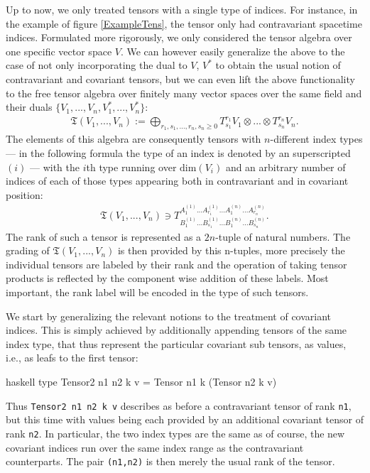 Up to now, we only treated tensors with a single type of indices. For instance, in the example of figure \ref{ExampleTens}, the tensor only had contravariant spacetime indices.
Formulated more rigorously, we only considered the tensor algebra over one specific vector space $V$.
We can however easily generalize the above to the case of not only incorporating the dual to $V$, $V^{\ast}$ to obtain the usual notion of contravariant and covariant tensors, but we can even lift the above functionality to the free tensor algebra over finitely many vector spaces over the same field and their duals $\{V_1,...,V_n,V_1^{\ast},...,V_n^{\ast}\}$:
\begin{align}
    \mathfrak{T}(V_1,...,V_n) := \bigoplus_{r_1,s_1,...,r_n,s_n \geq 0}T^{r_1}_{s_1}V_1 \otimes ... \otimes T^{r_n}_{s_n}V_n.
\end{align}
The elements of this algebra are consequently tensors with $n$-different index types --- in the following formula the type of an index is denoted by an superscripted $(i)$ --- with the $i$th type running over $\mathrm{dim}(V_i)$ and an arbitrary number of indices of each of those types appearing both in contravariant and in covariant position:
\begin{align}
    \mathfrak{T}(V_1,...,V_n) \ni T^{A^{(1)}_1 ... A^{(1)}_{r_1} ... A^{(n)}_1 ... A^{(n)}_{r_n}}
    _{B^{(1)}_1 ... B^{(1)}_{s_1} ... B^{(n)}_1 ... B^{(n)}_{s_n}}.
\end{align}
The rank of such a tensor is represented as a $2n$-tuple of natural numbers. The grading of $\mathfrak{T}(V_1,...,V_n)$ is then provided by this n-tuples, more precisely the individual tensors are labeled by their rank and the operation of taking tensor products is reflected by the component wise addition of these labels. Most important, the rank label will be encoded in the type of such tensors.

We start by generalizing the relevant notions to the treatment of covariant indices.
This is simply achieved by additionally appending tensors of the same index type, that thus represent the particular covariant sub tensors, as values, i.e., as leafs
to the first tensor:
\begin{center}
\begin{cminted}{haskell}
type Tensor2 n1 n2 k v = Tensor n1 k (Tensor n2 k v)
\end{cminted}
\end{center}
Thus \texttt{Tensor2 n1 n2 k v} describes as before a contravariant tensor of rank \texttt{n1}, but this time with values being each provided by an additional covariant tensor of rank \texttt{n2}. In particular, the two index types are the same as of course, the new covariant indices run over the same index range as the contravariant counterparts. The pair \texttt{(n1,n2)} is then merely the usual rank of the tensor.

